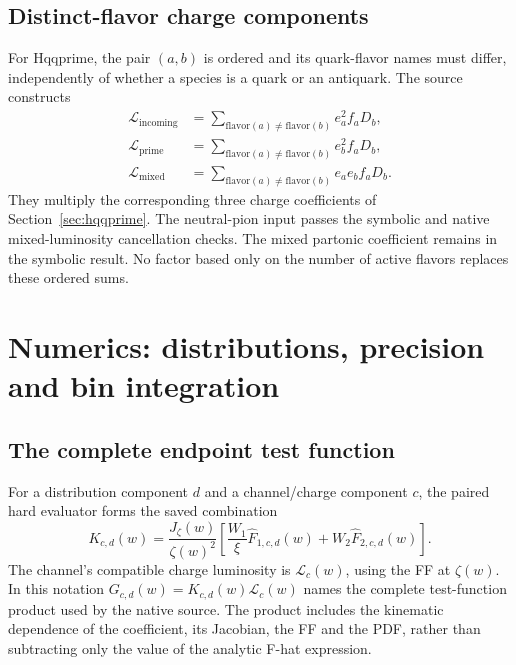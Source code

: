 \documentclass[11pt,a4paper]{article}
\newcommand{\Fhat}{\widehat F}
\begin{document}
\subsection{Distinct-flavor charge components}

For Hqqprime, the pair $(a,b)$ is ordered and its quark-flavor names
must differ, independently of whether a species is a quark or an
antiquark. The source constructs
\begin{align}
 \mathcal L_{\mathrm{incoming}}&=
 \sum_{\mathrm{flavor}(a)\ne\mathrm{flavor}(b)}e_a^2 f_aD_b,\\
 \mathcal L_{\mathrm{prime}}&=
 \sum_{\mathrm{flavor}(a)\ne\mathrm{flavor}(b)}e_b^2 f_aD_b,\\
 \mathcal L_{\mathrm{mixed}}&=
 \sum_{\mathrm{flavor}(a)\ne\mathrm{flavor}(b)}e_ae_b f_aD_b.
 \label{eq:primelums}
\end{align}
They multiply the corresponding three charge coefficients of
Section~\ref{sec:hqqprime}. The neutral-pion input passes the symbolic
and native mixed-luminosity cancellation checks. The mixed partonic
coefficient remains in the symbolic result. No factor based only on
the number of active flavors replaces these ordered sums.

\section{Numerics: distributions, precision and bin integration}
\label{sec:binintegration}

\subsection{The complete endpoint test function}

For a distribution component $d$ and a channel/charge component $c$,
the paired hard evaluator forms the saved combination
\begin{equation}
 K_{c,d}(w)=\frac{J_\zeta(w)}{\zeta(w)^2}
 \left[\frac{W_1}{\xi}\Fhat_{1,c,d}(w)
                         +W_2\Fhat_{2,c,d}(w)\right].
 \label{eq:pairedkernel}
\end{equation}
The channel's compatible charge luminosity is
$\mathcal L_c(w)$, using the FF at $\zeta(w)$. In this notation
$G_{c,d}(w)=K_{c,d}(w)\mathcal L_c(w)$ names the complete test-function
product used by the native source. The product includes the kinematic
dependence of the coefficient, its Jacobian, the FF and the PDF, rather
than subtracting only the value of the analytic F-hat expression.
\end{document}
